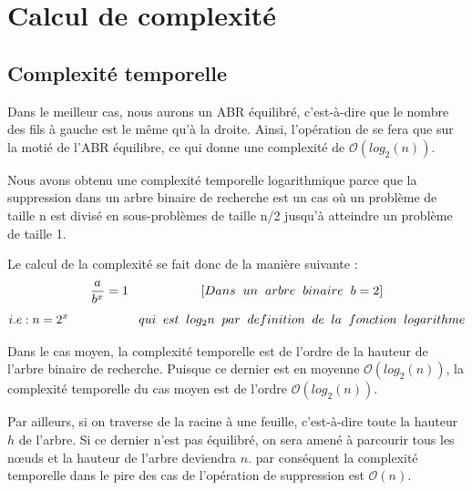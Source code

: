 \section{Calcul de complexité}
\subsection{Complexité temporelle}
Dans le meilleur cas, nous aurons un ABR équilibré, c’est-à-dire que le nombre des fils à gauche est le même qu’à la droite. Ainsi, l'opération de se fera que sur la motié de l'ABR équilibre, ce qui donne une complexité de $\mathcal{O}(log_2(n))$.  
\par
Nous avons obtenu une complexité temporelle logarithmique parce que la suppression dans un arbre binaire de recherche est un cas où un problème de taille n est divisé en sous-problèmes de taille n/2 jusqu'à atteindre un problème de taille 1.
\par
Le calcul de la complexité se fait donc de la manière suivante :
$$ \frac {a}{b^x}=1  \hspace{2cm}[Dans\hspace{0.2cm} un\hspace{0.2cm} arbre\hspace{0.2cm} binaire\hspace{0.2cm} b = 2] $$
$$i.e : n=2^x\hspace{2cm} qui\hspace{0.2cm} est\hspace{0.2cm} log_2 n\hspace{0.2cm} par\hspace{0.2cm} definition\hspace{0.2cm} de\hspace{0.2cm} la\hspace{0.2cm} fonction\hspace{0.2cm} logarithme$$
\par 
Dans le cas moyen, la complexité temporelle est de l’ordre de la hauteur de l’arbre binaire de recherche. Puisque ce dernier est en moyenne $\mathcal{O}(log_2(n))$, la complexité temporelle du cas moyen est de l’ordre $\mathcal{O}(log_2(n))$.
\par
Par ailleurs, si on traverse de la racine à une feuille, c’est-à-dire toute la hauteur $h$ de l’arbre. Si ce dernier n’est pas équilibré, on sera amené à parcourir tous les nœuds et la hauteur de l’arbre deviendra $n$. par conséquent la complexité temporelle dans le pire des cas de l’opération de suppression est $\mathcal{O}(n)$.
\par
